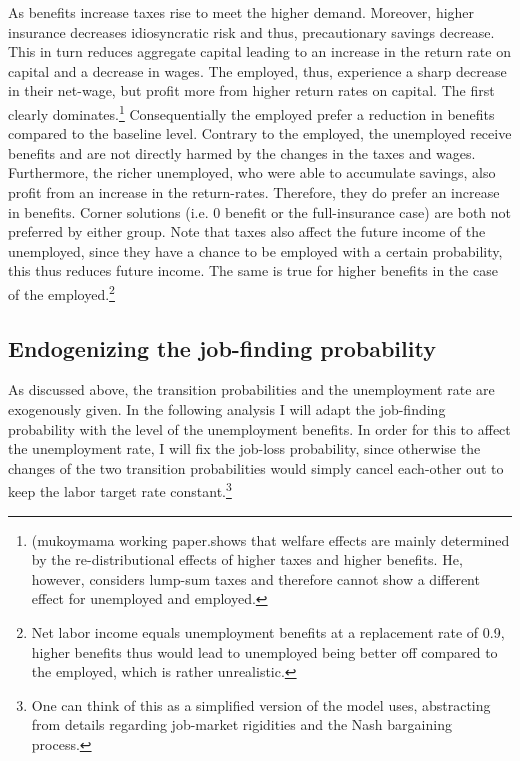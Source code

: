 \documentclass[a4paper,12pt]{article}
\begin{document}
As benefits increase taxes rise to meet the higher demand. Moreover, higher insurance decreases idiosyncratic risk and thus, precautionary savings decrease. This in turn reduces aggregate capital leading to an increase in the return rate on capital and a decrease in wages. 
The employed, thus, experience a sharp decrease in their net-wage, but profit more from higher return rates on capital. The first clearly dominates.\footnote{ (mukoymama working paper.shows that welfare effects are mainly determined by the re-distributional effects of higher taxes and higher benefits. He, however, considers lump-sum taxes and therefore cannot show a different effect for unemployed and employed.} Consequentially the employed prefer a reduction in benefits compared to the baseline level. 
Contrary to the employed, the unemployed receive benefits and are not directly harmed by the changes in the taxes and wages. Furthermore, the richer unemployed, who were able to accumulate savings, also profit from an increase in the return-rates. 
Therefore, they do prefer an increase in benefits. 
Corner solutions (i.e. 0 benefit or the full-insurance case) are both not preferred by either group. Note that taxes also affect the future income of the unemployed, since they have a chance to be employed with a certain probability, this thus reduces future income. The same is true for higher benefits in the case of the employed.\footnote{Net labor income equals unemployment benefits at a replacement rate of 0.9, higher benefits thus would lead to unemployed being better off compared to the employed, which is rather unrealistic.}


\subsection{Endogenizing the job-finding probability}

As discussed above, the transition probabilities and the unemployment rate are exogenously given. In the following analysis I will adapt the job-finding probability with the level of the unemployment benefits. In order for this to affect the unemployment rate, I will fix the job-loss probability, since otherwise the changes of the two transition probabilities would simply cancel each-other out to keep the labor target rate constant.\footnote{One can think of this as a simplified version of the model \cite{mukoyama} uses, abstracting from details regarding job-market rigidities and the Nash bargaining process.} 
\end{document}
